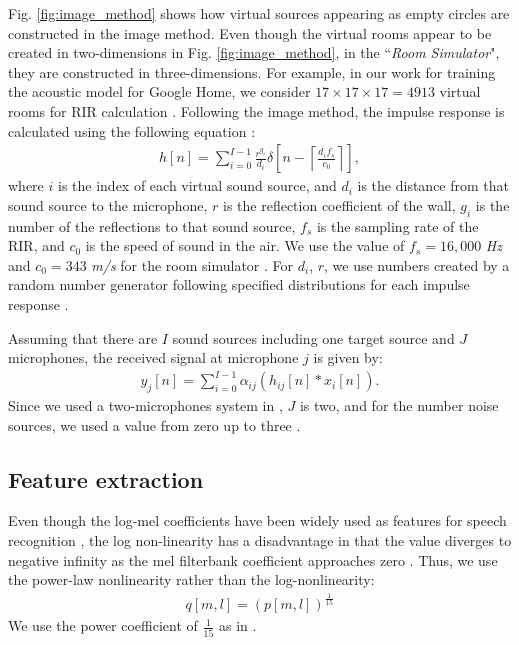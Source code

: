 \documentclass{article}
\begin{document}
Fig. \ref{fig:image_method} shows how virtual sources
appearing as empty circles are constructed in the image method.
Even though the virtual rooms appear to be created in two-dimensions
in Fig. \ref{fig:image_method}, in the ``\emph{Room Simulator}",
they are constructed in three-dimensions. For example, in our
work for training the acoustic model for Google Home, we consider
$17 \times 17 \times 17 = 4913$ virtual rooms for RIR calculation
\cite{C_Kim_INTERSPEECH_2017_1}.
Following the image method, the impulse response is calculated
using the following equation
\cite{ J_Allen_JASA_1979, E_A_Lehmann_ASPAA_2007}:
\begin{align}
    h[n] = \sum_{i = 0}^{I-1} \frac{r^{g_i}}{d_i}
    \delta \left[n -\left \lceil{\frac{d_i f_s}{c_0}}\right \rceil \right],
      \label{eq:h_n_calculation}
\end{align}
where $i$ is the index of each virtual sound source, and $d_i$ is the distance
from that sound source to the microphone, $r$ is
the reflection coefficient of the wall, $g_i$ is
the number of the reflections
to that sound source, $f_s$ is the sampling rate of the RIR, and $c_0$ is the
speed of sound in the air. We use the value of $f_s = 16,000$ \textit{Hz} and
$c_0 = 343$ \textit{m/s} for the room simulator \cite{B_Li_INTERSPEECH_2017_1}.
For $d_i$, $r$, we use numbers created by a random number generator
following specified distributions for each impulse response \cite{C_Kim_INTERSPEECH_2017_1}.

Assuming that there are $I$ sound sources including one target
source and $J$ microphones, the received signal at microphone
$j$ is given by:
\begin{align}
  y_j[n] =  \sum_{i=0}^{I-1} \alpha_{ij} \left(h_{ij}[n] * x_i[n]\right).
  \label{eq:y_j_def}
\end{align}
Since we used a two-microphones system in
\cite{B_Li_INTERSPEECH_2017_1, C_Kim_INTERSPEECH_2017_1},
$J$ is two, and for the number noise sources, we used a value from zero
up to three \cite{C_Kim_INTERSPEECH_2017_1}.
%


\subsection{Feature extraction}

Even though the log-mel coefficients have been widely used
as features for speech recognition \cite{sbdavisandpm1980},
the log non-linearity has a disadvantage in that the value
diverges to negative infinity as the mel filterbank coefficient
approaches zero \cite{C_Kim_IEEETran_2016_1}.
Thus, we use the power-law nonlinearity
rather than the log-nonlinearity:
\begin{align}
  q[m, l] =  (p[m, l])^{\frac{1}{15}}
  \label{eq:power_law_nonlineartiy}
\end{align}
We use the power coefficient of $\frac{1}{15}$ as in
\cite{C_Kim_IEEETran_2016_1, C_Kim_ICASSP_2012_1}.
\end{document}
